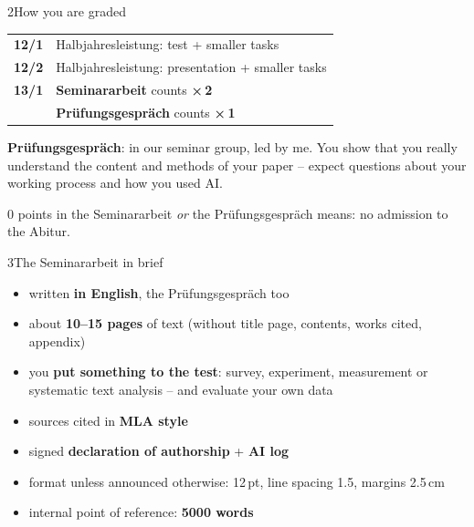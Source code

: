 \begin{minipage}[t]{0.49\linewidth}\vspace{0pt}
\begin{wsbox}[height=62mm]{2}{How you are graded}
\renewcommand{\arraystretch}{1.2}
\begin{tabularx}{\linewidth}{@{}l X@{}}
\arrayrulecolor{rule}
\textbf{12/1} & Halbjahresleistung: test + smaller tasks\\
\textbf{12/2} & Halbjahresleistung: presentation + smaller tasks\\\midrule
\textbf{13/1} & \textbf{Seminararbeit} \hfill counts \textbf{×\,2}\\
 & \textbf{Prüfungsgespräch} \hfill counts \textbf{×\,1}\\
\end{tabularx}
\par\vspace{1mm}
{\small\textbf{Prüfungsgespräch}: in our seminar group, led by me. You show that you really understand the content and methods of your paper – expect questions about your working process and how you used AI.
\vspace{-1mm}
\begin{badbox}\small 0 points in the Seminararbeit \emph{or} the Prüfungsgespräch means: no admission to the Abitur.\end{badbox}}
\end{wsbox}
\end{minipage}\hfill
\begin{minipage}[t]{0.49\linewidth}\vspace{0pt}
\begin{wsbox}[height=62mm]{3}{The Seminararbeit in brief}
\begin{itemize}[itemsep=0.6mm]
\item written \textbf{in English}, the Prüfungsgespräch too
\item about \textbf{10–15 pages} of text (without title page, contents, works cited, appendix)
\item you \textbf{put something to the test}: survey, experiment, measurement or systematic text analysis – and evaluate your own data
\item sources cited in \textbf{MLA style}
\item signed \textbf{declaration of authorship} + \textbf{AI log}
\item format unless announced otherwise: 12\,pt, line spacing 1.5, margins 2.5\,cm
\item internal point of reference: \textbf{5000 words}
\end{itemize}
\end{wsbox}
\end{minipage}

